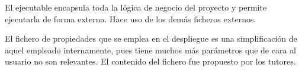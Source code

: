 El ejecutable encapsula toda la lógica de negocio del proyecto y permite ejecutarla de forma externa. Hace uso de los demás ficheros externos.

El fichero de propiedades que se emplea en el despliegue es una simplificación de aquel empleado internamente, pues tiene muchos más parámetros que de cara al usuario no son relevantes. El contenido del fichero fue propuesto por los tutores.
